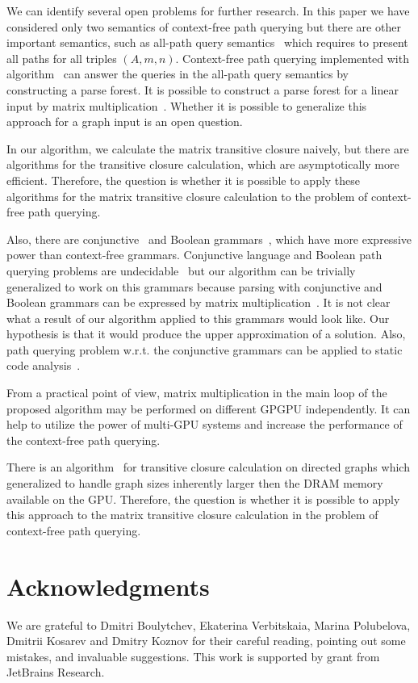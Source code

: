 \documentclass[runningheads,a4paper]{llncs}
\begin{document}
We can identify several open problems for further research. In this paper we have considered only two semantics of context-free path querying but there are other important semantics, such as all-path query semantics~\cite{hellingsPathQuerying} which requires to present all paths for all triples $(A,m,n)$. Context-free path querying implemented with algorithm~\cite{GLL} can answer the queries in the all-path query semantics by constructing a parse forest. It is possible to construct a parse forest for a linear input by matrix multiplication~\cite{okhotin_cyk}. Whether it is possible to generalize this approach for a graph input is an open question.

In our algorithm, we calculate the matrix transitive closure naively, but there are algorithms for the transitive closure calculation, which are asymptotically more efficient. Therefore, the question is whether it is possible to apply these algorithms for the matrix transitive closure calculation to the problem of context-free path querying.

Also, there are conjunctive~\cite{okhotinConjAndBool} and Boolean grammars~\cite{okhotinBoolean}, which have more expressive power than context-free grammars. Conjunctive language and Boolean path querying problems are undecidable~\cite{hellingsRelational} but our algorithm can be trivially generalized to work on this grammars because parsing with conjunctive and Boolean grammars can be expressed by matrix multiplication~\cite{okhotin_cyk}. It is not clear what a result of our algorithm applied to this grammars would look like. Our hypothesis is that it would produce the upper approximation of a solution. Also, path querying problem w.r.t. the conjunctive grammars can be applied to static code analysis~\cite{zhang2017context}.

From a practical point of view, matrix multiplication in the main loop of the proposed algorithm may be performed on different GPGPU independently. It can help to utilize the power of multi-GPU systems and increase the performance of the context-free path querying.

There is an algorithm~\cite{apspGPU} for transitive closure calculation on directed graphs which generalized to handle graph sizes inherently larger then the DRAM memory available on the GPU. Therefore, the question is whether it is possible to apply this approach to the matrix transitive closure calculation in the problem of context-free path querying.

\section*{Acknowledgments}%

We are grateful to Dmitri Boulytchev, Ekaterina Verbitskaia, Marina Polubelova, Dmitrii Kosarev and Dmitry Koznov for their careful reading, pointing out some mistakes, and invaluable suggestions.
This work is supported by grant from JetBrains Research.




\end{document}
